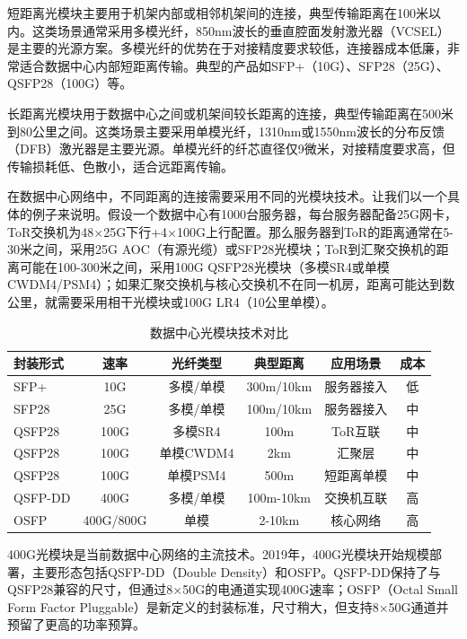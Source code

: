 短距离光模块主要用于机架内部或相邻机架间的连接，典型传输距离在100米以内。这类场景通常采用多模光纤，850nm波长的垂直腔面发射激光器（VCSEL）是主要的光源方案。多模光纤的优势在于对接精度要求较低，连接器成本低廉，非常适合数据中心内部短距离传输。典型的产品如SFP+（10G）、SFP28（25G）、QSFP28（100G）等。

长距离光模块用于数据中心之间或机架间较长距离的连接，典型传输距离在500米到80公里之间。这类场景主要采用单模光纤，1310nm或1550nm波长的分布反馈（DFB）激光器是主要光源。单模光纤的纤芯直径仅9微米，对接精度要求高，但传输损耗低、色散小，适合远距离传输。

在数据中心网络中，不同距离的连接需要采用不同的光模块技术。让我们以一个具体的例子来说明。假设一个数据中心有1000台服务器，每台服务器配备25G网卡，ToR交换机为48×25G下行+4×100G上行配置。那么服务器到ToR的距离通常在5-30米之间，采用25G AOC（有源光缆）或SFP28光模块；ToR到汇聚交换机的距离可能在100-300米之间，采用100G QSFP28光模块（多模SR4或单模CWDM4/PSM4）；如果汇聚交换机与核心交换机不在同一机房，距离可能达到数公里，就需要采用相干光模块或100G LR4（10公里单模）。

\begin{table}[htbp]
\centering
\caption{数据中心光模块技术对比}
\begin{tabular}{|l|c|c|c|c|c|}
\hline
\textbf{封装形式} & \textbf{速率} & \textbf{光纤类型} & \textbf{典型距离} & \textbf{应用场景} & \textbf{成本} \\
\hline
SFP+ & 10G & 多模/单模 & 300m/10km & 服务器接入 & 低 \\
\hline
SFP28 & 25G & 多模/单模 & 100m/10km & 服务器接入 & 中 \\
\hline
QSFP28 & 100G & 多模SR4 & 100m & ToR互联 & 中 \\
\hline
QSFP28 & 100G & 单模CWDM4 & 2km & 汇聚层 & 中 \\
\hline
QSFP28 & 100G & 单模PSM4 & 500m & 短距离单模 & 中 \\
\hline
QSFP-DD & 400G & 多模/单模 & 100m-10km & 交换机互联 & 高 \\
\hline
OSFP & 400G/800G & 单模 & 2-10km & 核心网络 & 高 \\
\hline
\end{tabular}
\end{table}

400G光模块是当前数据中心网络的主流技术。2019年，400G光模块开始规模部署，主要形态包括QSFP-DD（Double Density）和OSFP。QSFP-DD保持了与QSFP28兼容的尺寸，但通过8×50G的电通道实现400G速率；OSFP（Octal Small Form Factor Pluggable）是新定义的封装标准，尺寸稍大，但支持8×50G通道并预留了更高的功率预算。

